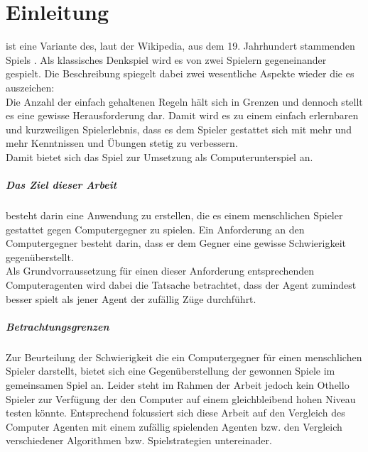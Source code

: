 \chapter{Einleitung}

 ist eine Variante des, laut der Wikipedia, aus dem 19. Jahrhundert stammenden Spiels  \cite{Wiki:EN:Reversi}. Als klassisches Denkspiel wird es von zwei Spielern gegeneinander gespielt. Die Beschreibung  \cite{Rose} spiegelt dabei zwei wesentliche Aspekte wieder die es auszeichen:
\\Die Anzahl der einfach gehaltenen Regeln hält sich in Grenzen und dennoch stellt es eine gewisse Herausforderung dar. Damit wird es zu einem einfach erlernbaren und kurzweiligen Spielerlebnis, dass es dem Spieler gestattet sich mit mehr und mehr Kenntnissen und Übungen stetig zu verbessern.
\\Damit bietet sich das Spiel zur Umsetzung als Computerunterspiel an.
\paragraph{Das Ziel dieser Arbeit} besteht darin eine Anwendung zu erstellen, die es einem menschlichen Spieler gestattet gegen Computergegner  zu spielen. Ein Anforderung an den Computergegner besteht darin, dass er dem Gegner eine gewisse Schwierigkeit gegenüberstellt.
\\Als Grundvorraussetzung für einen dieser Anforderung entsprechenden Computeragenten wird dabei die Tatsache betrachtet, dass der Agent zumindest besser spielt als jener Agent der zufällig Züge durchführt.
\paragraph{Betrachtungsgrenzen}
Zur Beurteilung der Schwierigkeit die ein Computergegner für einen menschlichen Spieler darstellt, bietet sich eine Gegenüberstellung der gewonnen Spiele im gemeinsamen Spiel an. Leider steht im Rahmen der Arbeit jedoch kein Othello Spieler zur Verfügung der den Computer auf einem gleichbleibend hohen Niveau testen könnte. Entsprechend fokussiert sich diese Arbeit auf den Vergleich des Computer Agenten mit einem zufällig spielenden Agenten bzw. den Vergleich verschiedener Algorithmen bzw. Spielstrategien untereinader.
\newpage
